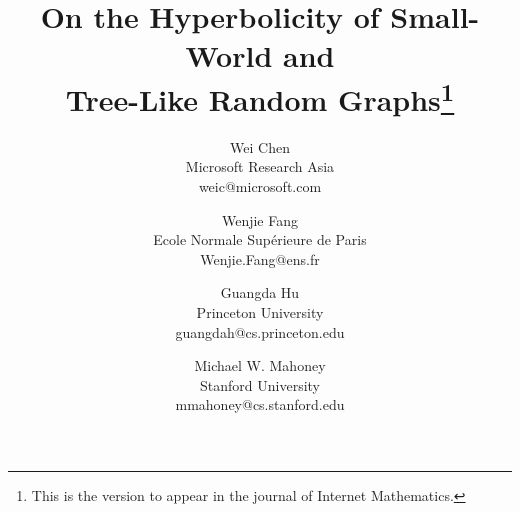 \documentclass[11pt]{article}
\begin{document}
\title{On the Hyperbolicity of Small-World and \\ Tree-Like Random Graphs\thanks{This is 
	the version to appear in the journal of Internet Mathematics.}}

\author{
Wei Chen\\
Microsoft Research Asia\\
weic@microsoft.com
\and
Wenjie Fang\\
Ecole Normale Sup\'erieure de Paris\\
Wenjie.Fang@ens.fr
\and
Guangda Hu\\
Princeton University\\
guangdah@cs.princeton.edu
\and
Michael W. Mahoney\\
Stanford University\\
mmahoney@cs.stanford.edu
}

\date{}


\maketitle



\end{document}
